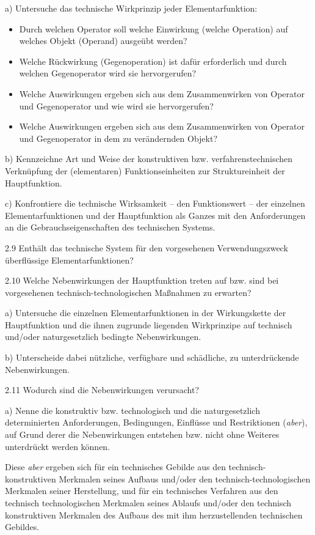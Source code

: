 \documentclass[12pt,a4paper]{article}
\begin{document}
a) Untersuche das technische Wirkprinzip jeder Elementarfunktion:
\begin{itemize}
\item Durch welchen Operator soll welche Einwirkung (welche Operation) auf
  welches Objekt (Operand) ausgeübt werden?
\item Welche Rückwirkung (Gegenoperation) ist dafür erforderlich und durch
  welchen Gegenoperator wird sie hervorgerufen?
\item Welche Auswirkungen ergeben sich aus dem Zusammenwirken von Operator und
  Gegenoperator und wie wird sie hervorgerufen?
\item Welche Auswirkungen ergeben sich aus dem Zusammenwirken von Operator und
  Gegenoperator in dem zu verändernden Objekt?
\end{itemize}

b) Kennzeichne Art und Weise der konstruktiven bzw. verfahrenstechnischen
Verknüpfung der (elementaren) Funktionseinheiten zur Struktureinheit der
Hauptfunktion.

c) Konfrontiere die technische Wirksamkeit – den Funktionswert – der einzelnen
Elementarfunktionen und der Hauptfunktion als Ganzes mit den Anforderungen an
die Gebrauchseigenschaften des technischen Systems.

2.9 Enthält das technische System für den vorgesehenen Verwendungszweck
überflüssige Elementarfunktionen?

2.10 Welche Nebenwirkungen der Hauptfunktion treten auf bzw. sind bei
vorgesehenen technisch-technologischen Maßnahmen zu erwarten?

a) Untersuche die einzelnen Elementarfunktionen in der Wirkungskette der
Hauptfunktion und die ihnen zugrunde liegenden Wirkprinzipe auf technisch
und/oder naturgesetzlich bedingte Nebenwirkungen.

b) Unterscheide dabei nützliche, verfügbare und schädliche, zu unterdrückende
Nebenwirkungen.

2.11  Wodurch sind die Nebenwirkungen verursacht?

a) Nenne die konstruktiv bzw. technologisch und die naturgesetzlich
determinierten Anforderungen, Bedingungen, Einflüsse und Restriktionen
(\emph{aber}), auf Grund derer die Nebenwirkungen entstehen bzw. nicht ohne
Weiteres unterdrückt werden können.

Diese \emph{aber} ergeben sich für ein technisches Gebilde aus den
technisch-konstruktiven Merkmalen seines Aufbaus und/oder den
technisch-technologischen Merkmalen seiner Herstellung, und für ein technisches
Verfahren aus den technisch technologischen Merkmalen seines Ablaufs und/oder
den technisch konstruktiven Merkmalen des Aufbaus des mit ihm herzustellenden
technischen Gebildes.
\end{document}
